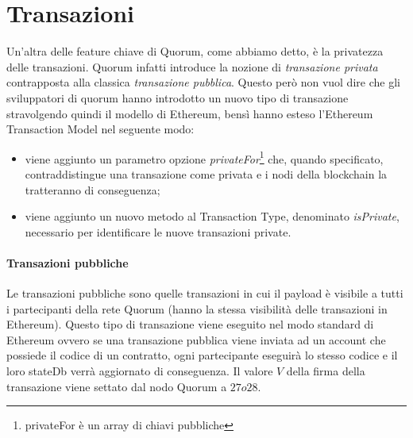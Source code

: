\section{Transazioni}
%
Un'altra delle feature chiave di Quorum, come abbiamo detto, è la privatezza delle transazioni. Quorum infatti introduce la nozione di \emph{transazione privata} contrapposta alla classica \emph{transazione pubblica}. Questo però non vuol dire che gli sviluppatori di quorum hanno introdotto un nuovo tipo di transazione stravolgendo quindi il modello di Ethereum, bensì hanno esteso l'Ethereum Transaction Model nel seguente modo:
\begin{itemize}
	\item viene aggiunto un parametro opzione \emph{privateFor}\footnote{privateFor è un array di chiavi pubbliche} che, quando specificato, contraddistingue una transazione come privata e i nodi della blockchain la tratteranno di conseguenza;
	\item viene aggiunto un nuovo metodo al Transaction Type, denominato \emph{isPrivate}, necessario per identificare le nuove transazioni private.
\end{itemize}%
\paragraph{Transazioni pubbliche}%
Le transazioni pubbliche sono quelle transazioni in cui il payload è visibile a tutti i partecipanti della rete Quorum (hanno la stessa visibilità delle transazioni in Ethereum). Questo tipo di transazione viene eseguito nel modo standard di Ethereum ovvero se una transazione pubblica viene inviata ad un account che possiede il codice di un contratto, ogni partecipante eseguirà lo stesso codice e il loro stateDb verrà aggiornato di conseguenza. Il valore $V$ della firma della transazione viene settato dal nodo Quorum a $27 o 28$.
%
